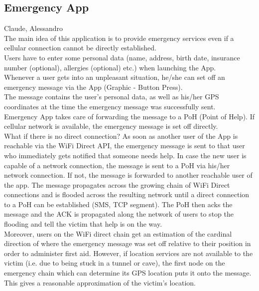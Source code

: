 \subsection{Emergency App}
Claude, Alessandro \\
The main idea of this application is to provide emergency services even if a cellular connection cannot be directly established. \\
Users have to enter some personal data (name, address, birth date, insurance number (optional), allergies (optional) etc.) when launching the App. \\
Whenever a user gets into an unpleasant situation, he/she can set off an emergency message via the App (Graphic - Button Press). \\
The message contains the user's personal data, as well as his/her GPS coordinates at the time the emergency message was successfully sent. \\
Emergency App takes care of forwarding the message to a PoH (Point of Help). If cellular network is available, the emergency message is set off directly. \\
What if there is no direct connection? As soon as another user of the App is reachable via the WiFi Direct API, the emergency message is sent to that user who immediately gets notified that someone needs help. In case the new user is capable of a network connection, the message is sent to a PoH via his/her network connection. If not, the message is forwarded to another reachable user of the app. The message propagates across the growing chain of WiFi Direct connections and is flooded across the resulting network until a direct connection to a PoH can be established (SMS, TCP segment). The PoH then acks the message and the ACK is propagated along the network of users to stop the flooding and tell the victim that help is on the way. \\
Moreover, users on the WiFi direct chain get an estimation of the cardinal direction of where the emergency message was set off relative to their position in order to administer first aid.
However, if location services are not available to the victim (i.e. due to being stuck in a tunnel or cave), the first node on the emergency chain which can determine its GPS location puts it onto the message. This gives a reasonable approximation of the victim's location. \\
		
